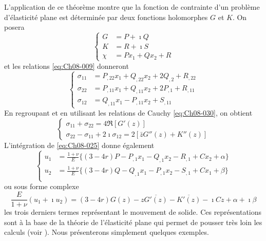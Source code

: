 L'application de ce théorème montre que la fonction de contrainte d'un problème d'élasticité plane est déterminée par deux fonctions holomorphes $G$ et $K$.
On posera 
\begin{equation}
  \begin{cases}
    G    & = P + \imath Q \\
    K    & = R + \imath S \\
    \chi & = Px_1 + Qx_2 + R
  \end{cases}
\label{eq:Ch08-031}
\end{equation}
et les relations \eqref{eq:Ch08-009} donneront 
\begin{equation}
  \begin{cases}
    \sigma_{11} & = P_{,22} x_1 + Q_{,22} x_2 + 2 Q_{,2} + R_{,22} \\
    \sigma_{22} & = P_{,11} x_1 + Q_{,11} x_2 + 2 P_{,1} + R_{,11} \\
    \sigma_{12} & = Q_{,11} x_1 - P_{,11} x_2 + S_{,11}
  \end{cases}
\label{eq:Ch08-032}
\end{equation}
En regroupant et en utilisant les relations de Cauchy \eqref{eq:Ch08-030}, on obtient 
\begin{equation}
    \begin{cases}
        \sigma_{11} + \sigma_{22} = 4 \Re \left[ G'(z) \right] \\
        \sigma_{22} - \sigma_{11} + 2 \imath \sigma_{12} = 2 \left[ \bar{z}G''(z) + K''(z) \right]
    \end{cases}
    \label{eq:Ch08-033}
\end{equation}
L'intégration de \eqref{eq:Ch08-025} donne également 
\begin{equation}
  \begin{cases}
    u_1 & = \frac{1+\nu}{E}\{(3-4r)P - P_{,1}x_1 - Q_{,1}x_2 - R_{,1} + Cx_2 + \alpha \}\\
    u_2 & = \frac{1+\nu}{E}\{(3-4r)Q - Q_{,1}x_1 - P_{,1}x_2 - S_{,1} + Cx_1 + \beta \}\\
  \end{cases}
\label{eq:Ch08-034}
\end{equation}
ou sous forme complexe 
\begin{equation}
    \frac{E}{1+\nu}(u_1 + \imath u_2) = (3-4r)G(z) - z\overline{G'(z)} - \overline{K'(z)} - \imath C z + \alpha +\imath\beta
    \label{eq:Ch08-035}
\end{equation}
les trois derniers termes représentant le mouvement de solide. 
Ces représentations sont à la base de la théorie de l'élasticité plane qui permet de pousser très loin les calculs (voir \cite{Muskhelishvili-53}). 
Nous présenterons simplement quelques exemples.

